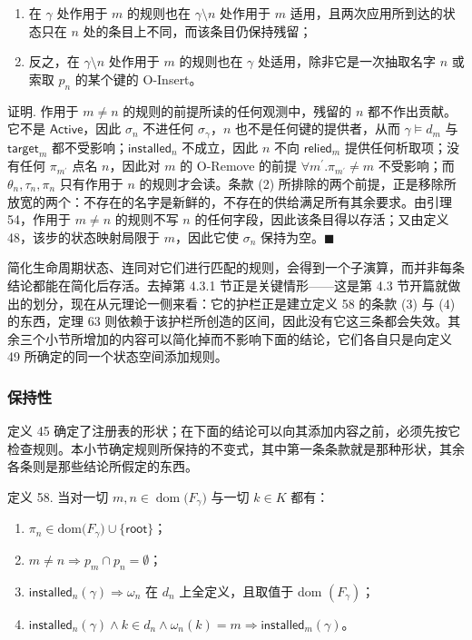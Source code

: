 \documentclass[
  10
]{article}
\providecommand{\tightlist}{%
  \setlength{\itemsep}{0pt}\setlength{\parskip}{0pt}}
\begin{document}
\begin{enumerate}
\def\labelenumi{\arabic{enumi}.}
\tightlist
\item
  在 $\gamma$ 处作用于 $m$ 的规则也在 $\gamma \setminus n$ 处作用于 $m$ 适用，且两次应用所到达的状态只在 $n$ 处的条目上不同，而该条目仍保持残留；
\item
  反之，在 $\gamma \setminus n$ 处作用于 $m$ 的规则也在 $\gamma$ 处适用，除非它是一次抽取名字 $n$ 或索取 $p _ { n }$ 的某个键的 O-Insert。
\end{enumerate}

证明. 作用于 $m \neq n$ 的规则的前提所读的任何观测中，残留的 $n$ 都不作出贡献。它不是 $\mathsf{Active}$，因此 $\sigma _ { n }$ 不进任何 $\sigma _ { \gamma }$，$n$ 也不是任何键的提供者，从而 $\gamma \models d _ { m }$ 与 $\mathsf{target}_{m}$ 都不受影响；$\mathsf{installed}_{n}$ 不成立，因此 $n$ 不向 $\mathsf{relied}_{m}$ 提供任何析取项；没有任何 $\pi _ { m ^ { \prime } }$ 点名 $n$，因此对 $m$ 的 O-Remove 的前提 $\forall m ^ { \prime } . \pi _ { m ^ { \prime } } \neq m$ 不受影响；而 $\theta _ { n } , \tau _ { n } , \pi _ { n }$ 只有作用于 $n$ 的规则才会读。条款 (2) 所排除的两个前提，正是移除所放宽的两个：不存在的名字是新鲜的，不存在的供给满足所有其余要求。由引理 54，作用于 $m \neq n$ 的规则不写 $n$ 的任何字段，因此该条目得以存活；又由定义 48，该步的状态映射局限于 $m$，因此它使 $\sigma _ { n }$ 保持为空。$\blacksquare$

简化生命周期状态、连同对它们进行匹配的规则，会得到一个子演算，而并非每条结论都能在简化后存活。去掉第 4.3.1 节正是关键情形——这是第 4.3 节开篇就做出的划分，现在从元理论一侧来看：它的护栏正是建立定义 58 的条款 (3) 与 (4) 的东西，定理 63 则依赖于该护栏所创造的区间，因此没有它这三条都会失效。其余三个小节所增加的内容可以简化掉而不影响下面的结论，它们各自只是向定义 49 所确定的同一个状态空间添加规则。

\subsubsection{保持性} \label{preservation}

定义 45 确定了注册表的形状；在下面的结论可以向其添加内容之前，必须先按它检查规则。本小节确定规则所保持的不变式，其中第一条条款就是那种形状，其余各条则是那些结论所假定的东西。

定义 58. 当对一切 $m , n \in \mathop { \mathrm { d o m } } \bigl ( F _ { \gamma } \bigr )$ 与一切 $k \in K$ 都有：

\begin{enumerate}
\def\labelenumi{\arabic{enumi}.}
\tightlist
\item
  $\pi _ { n } \in \mathrm { d o m } \bigl ( F _ { \gamma } \bigr ) \cup \{ \mathsf{root} \}$；
\item
  $m \neq n \Rightarrow p _ { m } \cap p _ { n } = \emptyset$；
\item
  $\mathsf{installed}_{n}(\gamma) \Rightarrow \omega _ { n }$ 在 $d _ { n }$ 上全定义，且取值于 dom $\left( F _ { \gamma } \right)$；
\item
  $\mathsf{installed}_{n}(\gamma) \wedge k \in d _ { n } \wedge \omega _ { n } ( k ) = m \Rightarrow \mathsf{installed}_{m}(\gamma)$。
\end{enumerate}
\end{document}
